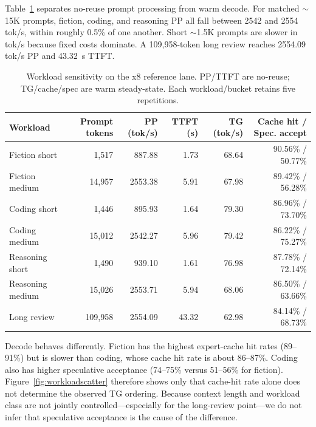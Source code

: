 Table~\ref{tab:workloads} separates no-reuse prompt processing from warm decode. For matched $\sim$15K prompts, fiction, coding, and reasoning PP all fall between 2542 and 2554 tok/s, within roughly 0.5\% of one another. Short $\sim$1.5K prompts are slower in tok/s because fixed costs dominate. A 109,958-token long review reaches 2554.09 tok/s PP and 43.32~s TTFT.

\begin{table}[t]
\centering
\caption{Workload sensitivity on the x8 reference lane. PP/TTFT are no-reuse; TG/cache/spec are warm steady-state. Each workload/bucket retains five repetitions.}
\label{tab:workloads}
\begin{tabular}{@{}lrrrrr@{}}
\toprule
Workload & Prompt tokens & PP (tok/s) & TTFT (s) & TG (tok/s) & Cache hit / Spec. accept \\
\midrule
Fiction short & 1,517 & 887.88 & 1.73 & 68.64 & 90.56\% / 50.77\% \\
Fiction medium & 14,957 & 2553.38 & 5.91 & 67.98 & 89.42\% / 56.28\% \\
Coding short & 1,446 & 895.93 & 1.64 & 79.30 & 86.96\% / 73.70\% \\
Coding medium & 15,012 & 2542.27 & 5.96 & 79.42 & 86.22\% / 75.27\% \\
Reasoning short & 1,490 & 939.10 & 1.61 & 76.98 & 87.78\% / 72.14\% \\
Reasoning medium & 15,026 & 2553.71 & 5.94 & 68.06 & 86.50\% / 63.66\% \\
Long review & 109,958 & 2554.09 & 43.32 & 62.98 & 84.14\% / 68.73\% \\
\bottomrule
\end{tabular}
\end{table}

Decode behaves differently. Fiction has the highest expert-cache hit rates (89--91\%) but is slower than coding, whose cache hit rate is about 86--87\%. Coding also has higher speculative acceptance (74--75\% versus 51--56\% for fiction). Figure~\ref{fig:workloadscatter} therefore shows only that cache-hit rate alone does not determine the observed TG ordering. Because context length and workload class are not jointly controlled---especially for the long-review point---we do not infer that speculative acceptance is the cause of the difference.


